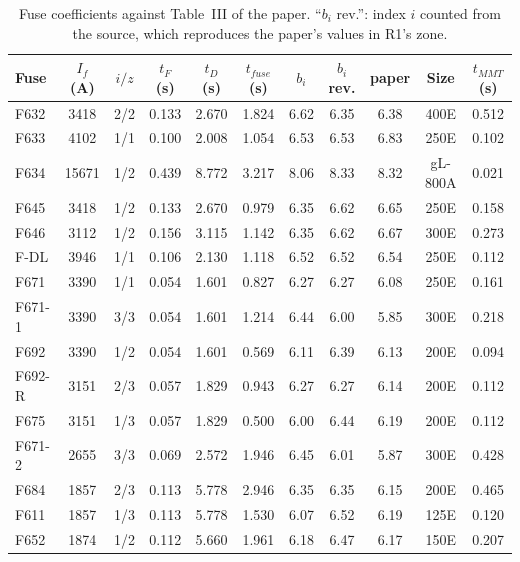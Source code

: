 \documentclass[12pt,a4paper]{article}
\begin{document}
\begin{table}[H]
\centering\footnotesize
\begin{tabular}{|l|c|c|c|c|c|c|c|c|c|c|}
\hline
\textbf{Fuse} & \textbf{$I_f$ (A)} & \textbf{$i/z$} & \textbf{$t_F$ (s)} & \textbf{$t_D$ (s)} & \textbf{$t_{fuse}$ (s)} &
\textbf{$b_i$} & \textbf{$b_i$ rev.} & \textbf{paper} & \textbf{Size} & \textbf{$t_{MMT}$ (s)} \\ \hline
F632 & 3418 & 2/2 & 0.133 & 2.670 & 1.824 & 6.62 & 6.35 & 6.38 & 400E & 0.512 \\ \hline
F633 & 4102 & 1/1 & 0.100 & 2.008 & 1.054 & 6.53 & 6.53 & 6.83 & 250E & 0.102 \\ \hline
F634 & 15671 & 1/2 & 0.439 & 8.772 & 3.217 & 8.06 & 8.33 & 8.32 & gL-800A & 0.021 \\ \hline
F645 & 3418 & 1/2 & 0.133 & 2.670 & 0.979 & 6.35 & 6.62 & 6.65 & 250E & 0.158 \\ \hline
F646 & 3112 & 1/2 & 0.156 & 3.115 & 1.142 & 6.35 & 6.62 & 6.67 & 300E & 0.273 \\ \hline
F-DL & 3946 & 1/1 & 0.106 & 2.130 & 1.118 & 6.52 & 6.52 & 6.54 & 250E & 0.112 \\ \hline
F671 & 3390 & 1/1 & 0.054 & 1.601 & 0.827 & 6.27 & 6.27 & 6.08 & 250E & 0.161 \\ \hline
F671-1 & 3390 & 3/3 & 0.054 & 1.601 & 1.214 & 6.44 & 6.00 & 5.85 & 300E & 0.218 \\ \hline
F692 & 3390 & 1/2 & 0.054 & 1.601 & 0.569 & 6.11 & 6.39 & 6.13 & 200E & 0.094 \\ \hline
F692-R & 3151 & 2/3 & 0.057 & 1.829 & 0.943 & 6.27 & 6.27 & 6.14 & 200E & 0.112 \\ \hline
F675 & 3151 & 1/3 & 0.057 & 1.829 & 0.500 & 6.00 & 6.44 & 6.19 & 200E & 0.112 \\ \hline
F671-2 & 2655 & 3/3 & 0.069 & 2.572 & 1.946 & 6.45 & 6.01 & 5.87 & 300E & 0.428 \\ \hline
F684 & 1857 & 2/3 & 0.113 & 5.778 & 2.946 & 6.35 & 6.35 & 6.15 & 200E & 0.465 \\ \hline
F611 & 1857 & 1/3 & 0.113 & 5.778 & 1.530 & 6.07 & 6.52 & 6.19 & 125E & 0.120 \\ \hline
F652 & 1874 & 1/2 & 0.112 & 5.660 & 1.961 & 6.18 & 6.47 & 6.17 & 150E & 0.207 \\ \hline
\end{tabular}
\caption{Fuse coefficients against Table~III of the paper. ``$b_i$ rev.'': index $i$ counted from the source,
which reproduces the paper's values in R1's zone.}
\label{tab:e3}
\end{table}
\end{document}

